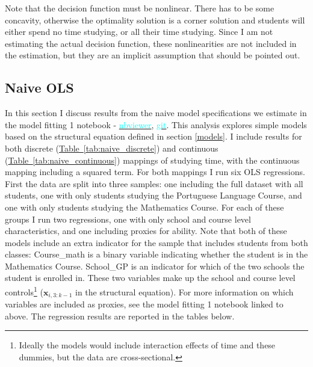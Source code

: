 \documentclass[12pt]{article}
\begin{document}
Note that the decision function must be nonlinear. There has to be some concavity, otherwise the optimality solution is a corner solution and students will either spend no time studying, or all their time studying. Since I am not estimating the actual decision function, these nonlinearities are not included in the estimation, but they are an implicit assumption that should be pointed out.

\subsection{Naive OLS}
In this section I discuss results from the naive model specifications we estimate in the model fitting 1 notebook -  \href{https://nbviewer.jupyter.org/github/nadavtadelis/Reproducible_Metrics/blob/master/model_fitting_1.ipynb}{\textcolor{cyan}{nbviewer}}, \href{https://github.com/nadavtadelis/Reproducible_Metrics/blob/master/model_fitting_1.ipynb}{\textcolor{cyan}{git}}. This analysis explores simple models based on the structural equation defined in section \ref{models}. I include results for both discrete (\hyperref[tab:naive_discrete]{Table~\ref*{tab:naive_discrete}}) and continuous (\hyperref[tab:naive_continuous]{Table~\ref*{tab:naive_continuous}}) mappings of studying time, with the continuous mapping including a squared term. For both mappings I run six OLS regressions. First the data are split into three samples: one including the full dataset with all students, one with only students studying the Portuguese Language Course, and one with only students studying the Mathematics Course. For each of these groups I run two regressions, one with only school and course level characteristics, and one including proxies for ability. Note that both of these models include an extra indicator for the sample that includes students from both classes: Course\_math is a binary variable indicating whether the student is in the Mathematics Course. School\_GP is an indicator for which of the two schools the student is enrolled in. These two variables make up the school and course level controls\footnote{Ideally the models would include interaction effects of time and these dummies, but the data are cross-sectional.} ($\bm{x}_{i,3:k-1}$ in the structural equation). For more information on which variables are included as proxies, see the model fitting 1 notebook linked to above. The regression results are reported in the tables below.
\end{document}
